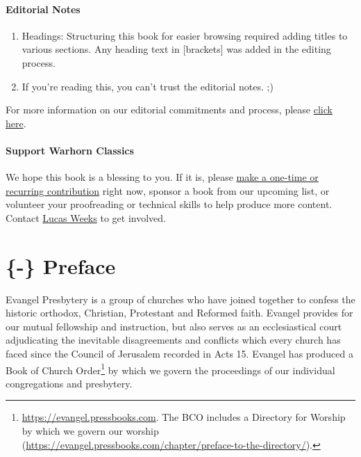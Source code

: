 \documentclass[
]{book}
\providecommand{\tightlist}{%
  \setlength{\itemsep}{0pt}\setlength{\parskip}{0pt}}
\begin{document}
\hypertarget{editorial-notes}{%
\subsubsection*{Editorial Notes}\label{editorial-notes}}

\begin{enumerate}
\def\labelenumi{\arabic{enumi}.}
\tightlist
\item
  Headings: Structuring this book for easier browsing required adding titles to various sections. Any heading text in {[}brackets{]} was added in the editing process.
\item
  If you're reading this, you can't trust the editorial notes. ;)
\end{enumerate}

For more information on our editorial commitments and process, please \href{https://classics.warhornmedia.com/editorial}{click here}.

\hypertarget{support-warhorn-classics}{%
\subsubsection*{Support Warhorn Classics}\label{support-warhorn-classics}}

We hope this book is a blessing to you. If it is, please \href{https://warhornmedia.com/give}{make a one-time or recurring contribution} right now, sponsor a book from our upcoming list, or volunteer your proofreading or technical skills to help produce more content. Contact \href{mailto:lucas@beggarsborn.com}{Lucas Weeks} to get involved.

\clearpage
\setcounter{page}{1}

\hypertarget{preface}{%
\chapter{\{-\} Preface}\label{preface}}

Evangel Presbytery is a group of churches who have joined together to confess the historic orthodox, Christian, Protestant and Reformed faith. Evangel provides for our mutual fellowship and instruction, but also serves as an ecclesiastical court adjudicating the inevitable disagreements and conflicts which every church has faced since the Council of Jerusalem recorded in Acts 15. Evangel has produced a Book of Church Order\footnote{\url{https://evangel.pressbooks.com}. The BCO includes a Directory for Worship by which we govern our worship (\url{https://evangel.pressbooks.com/chapter/preface-to-the-directory/}).} by which we govern the proceedings of our individual congregations and presbytery.
\end{document}

